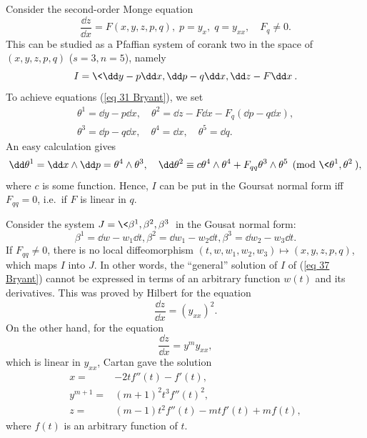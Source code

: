 \begin{example}
    Consider the second-order Monge equation 
    \[\frac{\dd z}{\dd x}=F(x,y,z,p,q),\; p=y_x, \; q=y_{xx},\quad F_q\neq 0.\label{eq 37 Bryant}\]
    This can be studied as a Pfaffian system of corank two in the space of $(x,y,z,p,q)$ ($s=3,n=5$), namely 
    \[I=\<\dd y-p\dd x,\dd p-q\dd x,\dd z-F\dd x\>.\]
    To achieve equations (\ref{eq 31 Bryant}), we set 
    \begin{align}
        \theta^1=\dd y-p\dd x,\quad \theta^2=\dd z-F\dd x-F_q (\dd p- q\dd x),\\
        \theta^3=\dd p-q\dd x,\quad  \theta^4=\dd x,\quad \theta^5=\dd q.
    \end{align}
    An easy calculation gives 
    \[\dd\theta^1=\dd x\wedge\dd p=\theta^4\wedge\theta^3,\quad \dd\theta^2\equiv c\theta^4\wedge\theta^4+F_{qq}\theta^3\wedge\theta^5\pmod{\<\theta^1,\theta^2\>},\]
    where $c$ is some function. Hence, $I$ can be put in the Goursat normal form iff $F_{qq}=0$, i.e.\ if $F$ is linear in $q$.
    
    Consider the system $J=\<\beta^1,\beta^2,\beta^3\>$ in the Gousat normal form:
    \[\beta^1=\dd w-w_1\dd t,\beta^2=\dd w_1-w_2\dd t, \beta^3=\dd w_2-w_3\dd t.\]
    If $F_{qq}\neq 0$, there is no local diffeomorphism $(t,w,w_1,w_2,w_3)\mapsto (x,y,z,p,q)$, which maps $I$ into $J$. In other words, the ``general'' solution of $I$ of (\ref{eq 37 Bryant}) cannot be expressed in terms of an arbitrary function $w(t)$ and its derivatives. This was proved by Hilbert for the equation 
    \[\frac{\dd z}{\dd x}=(y_{xx})^2.\]
    On the other hand, for the equation 
    \[\frac{\dd z}{\dd x}=y^m y_{xx},\]
    which is linear in $y_{xx}$, Cartan gave the solution 
    \begin{align}
        x=& -2tf''(t)-f'(t),\\
        y^{m+1}=&(m+1)^2 t^3 f''(t)^2,\\
        z=&(m-1)t^2 f''(t)-mtf'(t)+mf(t),
    \end{align}
    where $f(t)$ is an arbitrary function of $t$. 
\end{example}


